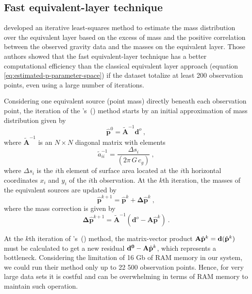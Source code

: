 \subsection{Fast equivalent-layer technique}
\citet{siqueira-etal2017} developed an iterative least-squares method to estimate the mass 
distribution over the equivalent layer based on the excess of mass and the positive correlation 
between the observed gravity data and the masses on the equivalent layer. Those authors showed 
that the fast equivalent-layer technique has a better computational efficiency than the 
classical equivalent layer approach (equation \ref{eq:estimated-p-parameter-space}) if the 
dataset totalize at least 200 observation points, even using a large number of iterations.

Considering one equivalent source (point mass) directly beneath each observation point, 
the iteration of the \citeauthor{siqueira-etal2017}'s~(\citeyear{siqueira-etal2017}) method 
starts by an initial approximation of mass distribution given by
\begin{equation}
\hat{\mathbf{p}}^0 = \tilde{\mathbf{A}}^{-1} \mathbf{d}^{o} \: ,
\label{eq:p0_fast_eqlayer}
\end{equation}
where $\tilde{\mathbf{A}}^{-1}$ is an $N \times N$ diagonal matrix with elements
\begin{equation}
\tilde{a}_{ii}^{-1} = \frac{\Delta s_i}{(2 \pi \, G \, c_g)} \: ,
\label{eq:aii_tilde_inv_fast_eqlayer}
\end{equation}
where $\Delta s_i$ is the $i$th element of surface area located at the $i$th horizontal 
coordinates $x_i$ and $y_i$ of the $i$th observation.
At the $k$th iteration, the masses of the equivalent sources are updated by
\begin{equation}
\hat{\mathbf{p}}^{k+1} = \hat{\mathbf{p}}^{k} + \mathbf{\Delta} \hat{\mathbf{p}}^{k} \: ,
\label{eq:p_k+1_fast_eqlayer}
\end{equation}
where the mass correction is given by
\begin{equation}
\mathbf{\Delta} \hat{\mathbf{p}}^{k+1} = \tilde{\mathbf{A}}^{-1} (\mathbf{d}^{o} - \mathbf{A} \hat{\mathbf{p}}^{k}) \: .
\label{eq:delta_p_k_fast_eqlayer}
\end{equation}

At the $k$th iteration of \citeauthor{siqueira-etal2017}'s~(\citeyear{siqueira-etal2017}) method, 
the matrix-vector product 
$\tensor{A} \hat{\mathbf{p}}^{k} = \mathbf{d}(\hat{\mathbf{p}}^{k})$ must be calculated to get a 
new residual $\mathbf{d^0} - \tensor{A} \hat{\mathbf{p}}^{k}$, which represents a bottleneck. 
Considering the limitation of 16 Gb of RAM 
memory in our system, we could run their method only up to 22 500 observation points. 
Hence, for very large data sets it is costful and can be overwhelming in terms of RAM 
memory to maintain such operation.

